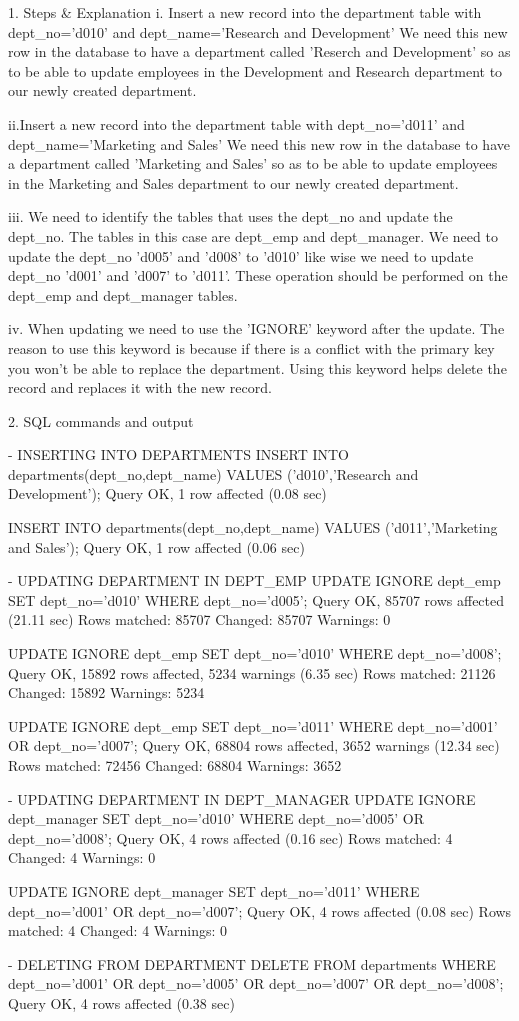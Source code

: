 1. Steps & Explanation
	i. Insert a new record into the department table with dept_no='d010' and dept_name='Research and 								   Development'
	   We need this new row in the database to have a department called 'Reserch and Development' so as to 	be able to
	   update employees in the Development and Research department to our newly created department.
	   
    ii.Insert a new record into the department table with dept_no='d011' and dept_name='Marketing and Sales'
	   We need this new row in the database to have a department called 'Marketing and Sales' so as to be able to
	   update employees in the Marketing and Sales department to our newly created department.
	   
	iii. We need to identify the tables that uses the dept_no and update the dept_no. The tables in this case are dept_emp 				 and dept_manager. We need to update the dept_no 'd005' and 'd008' to 'd010' like wise we need to update dept_no 				 'd001' and 'd007' to 'd011'. These operation should be performed on the dept_emp and dept_manager tables.
	
	iv. When updating we need to use the 'IGNORE' keyword after the update. The reason to use this keyword is because if 				there is a conflict with the primary key you won't be able to replace the department. Using this keyword helps 					delete the record and replaces it with the new record.

	
2. SQL commands and output
	
	- INSERTING INTO DEPARTMENTS
		INSERT INTO departments(dept_no,dept_name) VALUES ('d010','Research and Development');
		Query OK, 1 row affected (0.08 sec)
	
		INSERT INTO departments(dept_no,dept_name) VALUES ('d011','Marketing and Sales');
		Query OK, 1 row affected (0.06 sec)
	
	- UPDATING DEPARTMENT IN DEPT_EMP
		UPDATE IGNORE dept_emp SET dept_no='d010' WHERE dept_no='d005';
		Query OK, 85707 rows affected (21.11 sec)
		Rows matched: 85707  Changed: 85707  Warnings: 0
		
		UPDATE IGNORE dept_emp SET dept_no='d010' WHERE dept_no='d008';
		Query OK, 15892 rows affected, 5234 warnings (6.35 sec)
		Rows matched: 21126  Changed: 15892  Warnings: 5234
		
		UPDATE IGNORE dept_emp SET dept_no='d011' WHERE dept_no='d001' OR dept_no='d007';
		Query OK, 68804 rows affected, 3652 warnings (12.34 sec)
		Rows matched: 72456  Changed: 68804  Warnings: 3652
	
	- UPDATING DEPARTMENT IN DEPT_MANAGER
		UPDATE IGNORE dept_manager SET dept_no='d010' WHERE dept_no='d005' OR dept_no='d008';
		Query OK, 4 rows affected (0.16 sec)
		Rows matched: 4  Changed: 4  Warnings: 0
		
		UPDATE IGNORE dept_manager SET dept_no='d011' WHERE dept_no='d001' OR dept_no='d007';
		Query OK, 4 rows affected (0.08 sec)
		Rows matched: 4  Changed: 4  Warnings: 0
		
	- DELETING FROM DEPARTMENT
		DELETE FROM departments WHERE dept_no='d001' OR dept_no='d005' OR dept_no='d007' OR dept_no='d008';
		Query OK, 4 rows affected (0.38 sec)